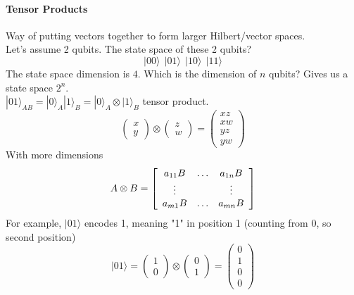 \documentclass[10pt]{report}
\begin{document}
\paragraph{Tensor Products} Way of putting vectors together to form larger Hilbert/vector spaces.\\
Let's assume 2 qubits. The state space of these 2 qubits?
$$|00\rangle\:\:|01\rangle\:\:|10\rangle\:\:|11\rangle$$
The state space dimension is $4$. Which is the dimension of $n$ qubits? Gives us a state space $2^n$.\\
$|01\rangle_{AB} = |0\rangle_A|1\rangle_B = |0\rangle_A\otimes|1\rangle_B$ tensor product.
$$\left(\begin{array}{c}
x\\y
\end{array}\right)\otimes\left(\begin{array}{c}
z\\w
\end{array}\right) = \left(\begin{array}{c}
xz\\xw\\yz\\yw
\end{array}\right)$$
With more dimensions
$$A\otimes B = \left[\begin{array}{c c c}
a_{11}B & \ldots & a_{1n}B\\
\vdots & & \vdots\\
a_{m1}B & \ldots & a_{mn}B
\end{array}\right]$$
For example, $|01\rangle$ encodes 1, meaning "1" in position 1 (counting from 0, so second position)
$$|01\rangle = \left(\begin{array}{c}
1\\0
\end{array}\right)\otimes\left(\begin{array}{c}
0\\1
\end{array}\right) = \left(\begin{array}{c}
0\\1\\0\\0
\end{array}\right)$$
\end{document}
